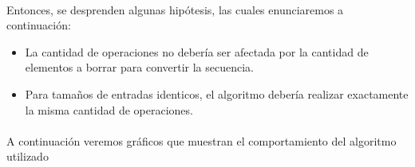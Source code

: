 \paragraph{}
Entonces, se desprenden algunas hipótesis, las cuales enunciaremos a continuación:
\begin{itemize}
  
  \item La cantidad de operaciones no debería ser afectada por la cantidad de elementos a borrar para convertir la secuencia.

  \item Para tamaños de entradas identicos, el algoritmo debería realizar exactamente la misma cantidad de operaciones.

\end{itemize}




\paragraph{}
A continuación veremos gráficos que muestran el comportamiento del algoritmo utilizado

